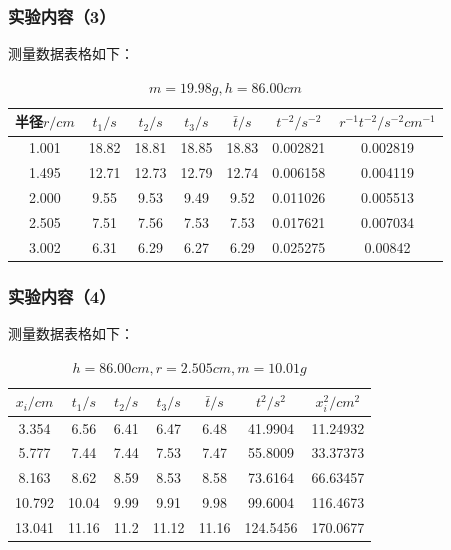 \documentclass{ctexart}
\begin{document}
      \subsubsection{实验内容（3）}
      测量数据表格如下：
\begin{table}[H]
  \centering
  \caption{$m=19.98g,h=86.00cm$}
    \begin{tabular}{|c|c|c|c|c|c|c|}\hline
    {半径$r/cm$} & {$t_1/s$} & {$t_2/s$} & {$t_3/s$} & {$\bar{t}/s$} & {$t^{-2}/s^{-2}$} & {$r^{-1}t^{-2}/s^{-2}cm^{-1}$} \\\hline
    1.001  & 18.82 & 18.81 & 18.85 & 18.83 & 0.002821 & 0.002819 \\\hline
    1.495  & 12.71 & 12.73 & 12.79 & 12.74 & 0.006158 & 0.004119 \\\hline
    2.000  & 9.55  & 9.53  & 9.49  & 9.52  & 0.011026 & 0.005513 \\\hline
    2.505  & 7.51  & 7.56  & 7.53  & 7.53  & 0.017621 & 0.007034 \\\hline
    3.002  & 6.31  & 6.29  & 6.27  & 6.29  & 0.025275 & 0.00842 \\\hline
    \end{tabular}%
  \label{tab:addlabel}%
\end{table}%

      \subsubsection{实验内容（4）}
      测量数据表格如下：
\begin{table}[H]
  \centering
  \caption{$h=86.00cm,r=2.505cm,m=10.01g$}
    \begin{tabular}{|c|c|c|c|c|c|c|}\hline
    {$x_i/cm$} & {$t_1/s$} & {$t_2/s$} & {$t_3/s$} & {$\bar{t}/s$} & {$t^2/s^2$} & {$x_i^2/cm^2$} \\\hline
    3.354 & 6.56  & 6.41  & 6.47  & 6.48  & 41.9904 & 11.24932 \\\hline
    5.777 & 7.44  & 7.44  & 7.53  & 7.47  & 55.8009 & 33.37373 \\\hline
    8.163 & 8.62  & 8.59  & 8.53  & 8.58  & 73.6164 & 66.63457 \\\hline
    10.792 & 10.04 & 9.99  & 9.91  & 9.98  & 99.6004 & 116.4673 \\\hline
    13.041 & 11.16 & 11.2  & 11.12 & 11.16 & 124.5456 & 170.0677 \\\hline
    \end{tabular}%
  \label{tab:addlabel}%
\end{table}%
\end{document}
